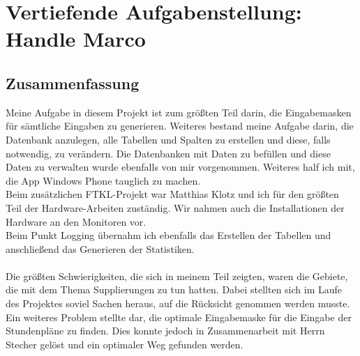 \chapter[Handle]{Vertiefende Aufgabenstellung: \\Handle Marco}

\section{Zusammenfassung}
Meine Aufgabe in diesem Projekt ist zum größten Teil darin, die Eingabemasken für sämtliche Eingaben zu generieren. Weiteres bestand meine Aufgabe darin, die Datenbank anzulegen, alle Tabellen und Spalten zu erstellen und diese, falls notwendig, zu verändern. Die Datenbanken mit Daten zu befüllen und diese Daten zu verwalten wurde ebenfalls von mir vorgenommen. Weiteres half ich mit, die App Windows Phone tauglich zu machen.\\
Beim zusätzlichen FTKL-Projekt war Matthias Klotz und ich für den größten Teil der Hardware-Arbeiten zuständig. Wir nahmen auch die Installationen der Hardware an den Monitoren vor.\\
Beim Punkt Logging übernahm ich ebenfalls das Erstellen der Tabellen und anschließend das Generieren der Statistiken.\\
\\
Die größten Schwierigkeiten, die sich in meinem Teil zeigten, waren die Gebiete, die mit dem Thema Supplierungen zu tun hatten. Dabei stellten sich im Laufe des Projektes soviel Sachen heraus, auf die Rücksicht genommen werden musste.\\
Ein weiteres Problem stellte dar, die optimale Eingabemaske für die Eingabe der Stundenpläne zu finden. Dies konnte jedoch in Zusammenarbeit mit Herrn Stecher gelöst und ein optimaler Weg gefunden werden. 
